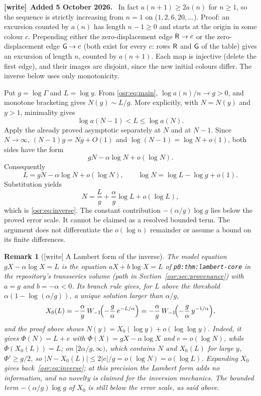 \documentclass[11pt,letterpaper]{article}
\newtheorem{remark}[theorem]{Remark}
\newcommand{\G}{\Gamma}\newcommand{\s}{\sqrt{17}}
\numberwithin{equation}{section}
\newenvironment{writenote}[1][]{\par\smallskip\begingroup\small
 \noindent\textbf{[write]}\if\relax\detokenize{#1}\relax\else~\textbf{#1.}\fi\ }%
 {\par\endgroup\smallskip}
\begin{document}
\begin{writenote}[Added 5 October 2026]
In fact $a(n+1)\ge2a(n)$ for $n\ge1$, so the sequence is strictly
increasing from $n=1$ on ($1,2,6,20,\dots$). Proof: an excursion counted by
$a(n)$ has length $n-1\ge0$ and starts at the origin in some colour $c$.
Prepending either the zero-displacement edge $\mathsf R\to c$ or the
zero-displacement edge $\mathsf G\to c$ (both exist for every $c$: rows $\mathsf R$ and
$\mathsf G$ of the table) gives an excursion of length $n$, counted by $a(n+1)$.
Each map is injective (delete the first edge), and their images are disjoint,
since the new initial colours differ. The inverse below uses only
monotonicity.
\end{writenote}

Put $g=\log\G$ and $L=\log y$. From \eqref{osr:eq:main}, $\log a(n)/n\to g>0$, and monotone bracketing gives $N(y)\sim L/g$. More explicitly, with $N=N(y)$ and $y>1$, minimality gives
\[
 \log a(N-1)<L\le\log a(N).
\]
Apply the already proved asymptotic separately at $N$ and at $N-1$. Since $N\to\infty$, $(N-1)g=Ng+O(1)$ and $\log(N-1)=\log N+o(1)$, both sides have the form
\[
 gN-\alpha\log N+o(\log N).
\]
Consequently
\[
 L=gN-\alpha\log N+o(\log N),\qquad
 \log N=\log L-\log g+o(1).
\]
Substitution yields
\[
 N=\frac Lg+\frac\alpha g\log L+o(\log L),
\]
which is \eqref{osr:eq:inverse}. The constant contribution $-(\alpha/g)\log g$ lies below the proved error scale. It cannot be claimed as a resolved bounded term. The argument does not differentiate the $o(\log n)$ remainder or assume a bound on its finite differences.

\begin{remark}[{[write]} A Lambert form of the inverse]\label{osr:rem:lambert}\upshape
The model equation $gX-\alpha\log X=L$ is the equation
$aX+b\log X=L$ of \nolinkurl{p0:thm:lambert-core} in the repository's
transseries volume (path in Section~\ref{osr:sec:provenance}) with $a=g$ and $b=-\alpha<0$. Its branch rule gives, for $L$ above the
threshold $\alpha(1-\log(\alpha/g))$, a unique solution larger than
$\alpha/g$,
\[
 X_0(L)=-\frac\alpha g\,W_{-1}\!\Bigl(-\frac g\alpha\,e^{-L/\alpha}\Bigr)
       =-\frac\alpha g\,W_{-1}\!\Bigl(-\frac g\alpha\,y^{-1/\alpha}\Bigr),
\]
and the proof above shows $N(y)=X_0(\log y)+o(\log\log y)$. Indeed, it gives
$\Phi(N)=L+e$ with $\Phi(X)=gX-\alpha\log X$ and $e=o(\log N)$, while
$\Phi(X_0(L))=L$; on $[2\alpha/g,\infty)$, which contains $N$ and $X_0(L)$
for large $y$, $\Phi'\ge g/2$, so $|N-X_0(L)|\le2|e|/g=o(\log N)=o(\log L)$.
Expanding $X_0$ gives back~\eqref{osr:eq:inverse}; at this precision the
Lambert form adds no information, and no novelty is claimed for the
inversion mechanics. The bounded term $-(\alpha/g)\log g$ of $X_0$ is still
below the error scale, as said above.
\end{remark}
\end{document}
